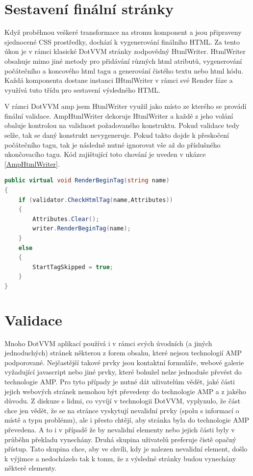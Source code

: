 \section{Sestavení finální stránky}
Když proběhnou veškeré transformace na stromu komponent a jsou připraveny sjednocené CSS prostředky, dochází k vygenerování finálního HTML. Za tento úkon je v rámci klasické DotVVM stránky zodpovědný HtmlWriter. HtmlWriter obsahuje mimo jiné metody pro přidávání různých html atributů, vygenerování počátečního a koncového html tagu a generování čistého textu nebo html kódu. Každá komponenta dostane instanci IHtmlWriter v rámci své Render fáze a využívá tuto třídu pro sestavení výsledného HTML.

V rámci DotVVM amp jsem HtmlWriter využil jako místo ze kterého se provádí finální validace. AmpHtmlWriter dekoruje HtmlWriter a každé z jeho volání obaluje kontrolou na validnost požadovaného konstruktu. Pokud validace tedy selže, tak se daný konstrukt nevygeneruje. Pokud takto dojde k přeskočení počátečního tagu, tak je následně nutné ignorovat vše až do příslušného ukončovacího tagu. Kód zajištující toto chování je uveden v ukázce \ref{AmpHtmlWriter}.


\begin{lstlisting}[language=c#, caption=Metoda RenderBeginTag na třídě AmpHtmlWriter ,label=AmpHtmlWriter,captionpos=t]
public virtual void RenderBeginTag(string name)
{
    if (validator.CheckHtmlTag(name,Attributes))
    {
        Attributes.Clear();
        writer.RenderBeginTag(name);
    }
    else
    {
        StartTagSkipped = true;
    }
}
\end{lstlisting}

\section{Validace}
Mnoho DotVVM aplikací používá i v rámci svých úvodních (a jiných jednoduchých) stránek některou z forem obsahu, které nejsou technologií AMP podporované. Nejčastější takové prvky jsou kontaktní formuláře, webové galerie vyžadující javascript nebo jiné prvky, které bohužel nelze jednoduše převést do technologie AMP.
Pro tyto případy je nutné dát uživatelům vědět, jaké části jejich webových stránek nemohou být převedeny do technologie AMP a z jakého důvodu. Z diskuze s lidmi, co vyvíjí v technologii DotVVM, vyplynulo, že část chce jen vědět, že se na stránce vyskytují nevalidní prvky (spolu s informací o místě a typu problému), ale i přesto chtějí, aby stránka byla do technologie AMP převedena. A to i v případě že by nevalidní elementy nebo jejich části byly v průběhu překladu vynechány. Druhá skupina uživatelů preferuje čistě opačný přístup. Tato skupina chce, aby ve chvíli, kdy je nalezen nevalidní element, došlo k výjimce a nedocházelo tak k tomu, že z výsledné stránky budou vynechány některé elementy.

